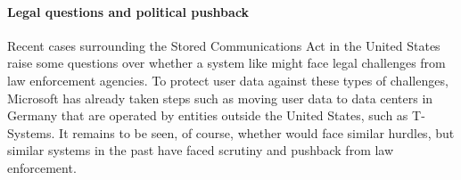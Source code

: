 \paragraph{Legal questions and political pushback} Recent cases surrounding
the Stored Communications Act in the United States raise some questions over
whether a system like \system{} might face legal challenges from law
enforcement agencies. To protect user data against these types of challenges,
Microsoft has already taken steps such as moving user data to data centers in
Germany that are operated by entities outside the United States, such as
T-Systems. It remains to be seen, of course, whether \system{} would face similar
hurdles, but similar systems in the past have faced scrutiny and pushback from law
enforcement.
